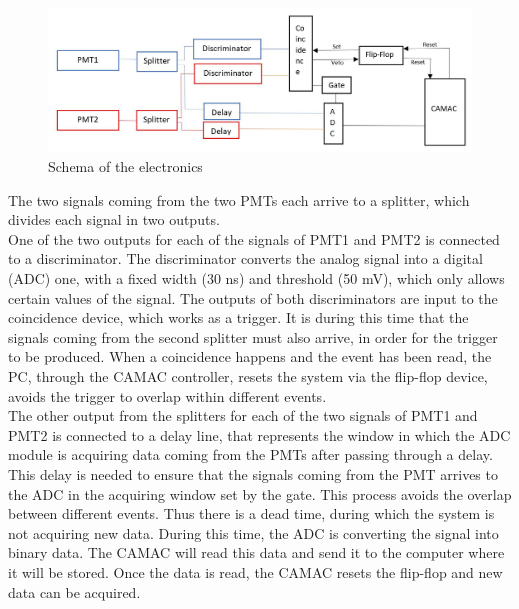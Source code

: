 \documentclass[10pt,swedish, openany]{book}
\begin{document}
\begin{figure}[H]
\includegraphics[scale=0.5]{electronics.JPG}
\centering
\caption{Schema of the electronics}
\label{fig:electronicsSchema}
\end{figure}

The two signals coming from the two PMTs each arrive to a splitter, which divides each signal in two outputs. \\

One of the two outputs for each of the signals of PMT1 and PMT2 is connected to a discriminator. The discriminator converts the analog signal into a digital (ADC) one, with a fixed width (30 ns) and threshold (50 mV), which only allows certain values of the signal. The outputs of both discriminators are input to the coincidence device, which works as a trigger.  It is during this time that the signals coming from the second splitter must also arrive, in order for the trigger to be produced. When a coincidence happens and the event has been read, the PC, through the CAMAC controller, resets the system via the flip-flop device, avoids the trigger to overlap within different events.\\

The other output from the splitters for each of the two signals of PMT1 and PMT2 is connected to a delay line, that represents the window in which the ADC module is acquiring data coming from the PMTs after passing through a delay. This delay is needed to ensure that the signals coming from the PMT arrives to the ADC in the acquiring window set by the gate. This process avoids the overlap between different events. Thus there is a dead time, during which the system is not acquiring new data. During this time, the ADC is converting the signal into binary data. The CAMAC will read this data and send it to the computer where it will be stored. Once the data is read, the CAMAC resets the flip-flop and new data can be acquired.
\end{document}
